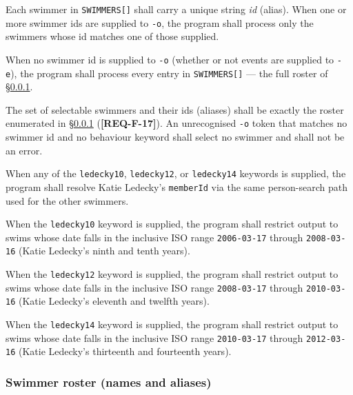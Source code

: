 \documentclass[12pt]{article}
\newcommand{\code}[1]{\texttt{#1}}
\newcommand{\req}[1]{\textbf{[#1]}}
\begin{document}
\begin{description}[style=nextline]
  \item[\req{REQ-F-10}] Each swimmer in \texttt{SWIMMERS[]} shall
        carry a unique string \emph{id} (alias).  When one or more
        swimmer ids are supplied to \code{-o}, the program shall
        process only the swimmers whose id matches one of those
        supplied.
  \item[\req{REQ-F-11}] When no swimmer id is supplied to \code{-o}
        (whether or not events are supplied to \code{-e}), the
        program shall process every entry in \texttt{SWIMMERS[]} ---
        the full roster of \S\ref{sec:roster}.
  \item[\req{REQ-F-12}] The set of selectable swimmers and their ids
        (aliases) shall be exactly the roster enumerated in
        \S\ref{sec:roster} (\req{REQ-F-17}).  An unrecognised
        \code{-o} token that matches no swimmer id and no behaviour
        keyword shall select no swimmer and shall not be an error.
  \item[\req{REQ-F-13}] When any of the \code{ledecky10},
        \code{ledecky12}, or \code{ledecky14} keywords is
        supplied, the program shall resolve Katie Ledecky's
        \code{memberId} via the same person-search path used for
        the other swimmers.
  \item[\req{REQ-F-14}] When the \code{ledecky10} keyword is
        supplied, the program shall restrict output to swims whose
        date falls in the inclusive ISO range
        \code{2006-03-17} through \code{2008-03-16}
        (Katie Ledecky's ninth and tenth years).
  \item[\req{REQ-F-15}] When the \code{ledecky12} keyword is
        supplied, the program shall restrict output to swims whose
        date falls in the inclusive ISO range
        \code{2008-03-17} through \code{2010-03-16}
        (Katie Ledecky's eleventh and twelfth years).
  \item[\req{REQ-F-16}] When the \code{ledecky14} keyword is
        supplied, the program shall restrict output to swims whose
        date falls in the inclusive ISO range
        \code{2010-03-17} through \code{2012-03-16}
        (Katie Ledecky's thirteenth and fourteenth years).
\end{description}

\subsubsection{Swimmer roster (names and aliases)}
\label{sec:roster}
\end{document}
